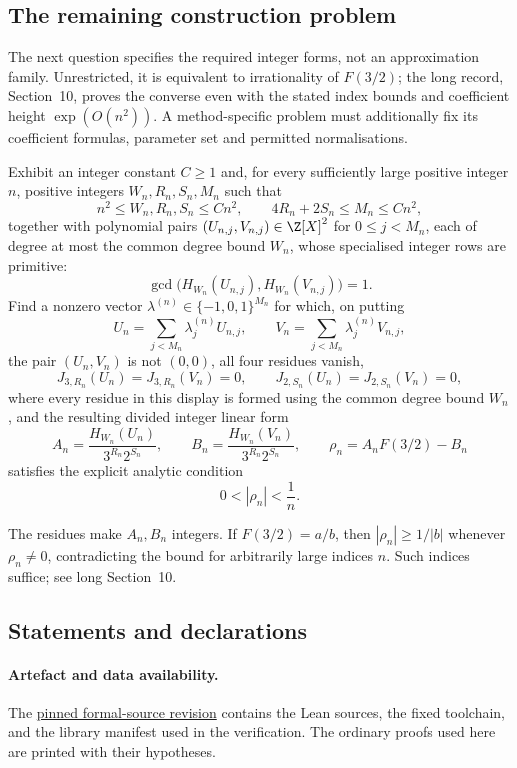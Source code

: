 \documentclass[11pt]{article}
\begin{document}
\subsection{The remaining construction problem}

The next question specifies the required integer forms, not an
approximation family. Unrestricted, it is equivalent to irrationality
of $F(3/2)$; the long record, Section~10, proves the converse even
with the stated index bounds and coefficient height $\exp(O(n^2))$.
A method-specific problem must additionally fix its coefficient
formulas, parameter set and permitted normalisations.

\begin{problem}\label{prob:kernel}
Exhibit an integer constant \(C\ge1\) and, for every sufficiently large
positive integer \(n\), positive integers \(W_n,R_n,S_n,M_n\) such that
\[
 n^2\le W_n,R_n,S_n\le Cn^2,
 \qquad 4R_n+2S_n\le M_n\le Cn^2,
\]
together with polynomial pairs
\((U_{n,j},V_{n,j})\in\Z[X]^2\) for \(0\le j<M_n\), each of degree at most
the common degree bound \(W_n\), whose specialised integer rows are
primitive:
\[
 \gcd\!\bigl(H_{W_n}(U_{n,j}),H_{W_n}(V_{n,j})\bigr)=1.
\]
Find a nonzero vector
\(\lambda^{(n)}\in\{-1,0,1\}^{M_n}\) for which, on putting
\[
 U_n=\sum_{j<M_n}\lambda^{(n)}_jU_{n,j},
 \qquad V_n=\sum_{j<M_n}\lambda^{(n)}_jV_{n,j},
\]
the pair \((U_n,V_n)\) is not \((0,0)\), all four residues vanish,
\[
 J_{3,R_n}(U_n)=J_{3,R_n}(V_n)=0,
 \qquad J_{2,S_n}(U_n)=J_{2,S_n}(V_n)=0,
\]
where every residue in this display is formed using the common degree bound \(W_n\),
and the resulting divided integer linear form
\[
 A_n=\frac{H_{W_n}(U_n)}{3^{R_n}2^{S_n}},
 \qquad
 B_n=\frac{H_{W_n}(V_n)}{3^{R_n}2^{S_n}},
 \qquad
 \rho_n=A_nF(3/2)-B_n
\]
satisfies the explicit analytic condition
\[
 0<|\rho_n|<\frac1n.
\]
\end{problem}

The residues make $A_n,B_n$ integers. If $F(3/2)=a/b$, then
$|\rho_n|\ge1/|b|$ whenever $\rho_n\ne0$, contradicting the bound
for arbitrarily large indices $n$. Such indices suffice; see long
Section~10.

\subsection*{Statements and declarations}

\paragraph{Artefact and data availability.} The
\href{\sourceurl}{pinned formal-source revision} contains the Lean sources, the
fixed toolchain, and the library manifest used in the verification.  The ordinary proofs used here are printed with their hypotheses.
\end{document}

